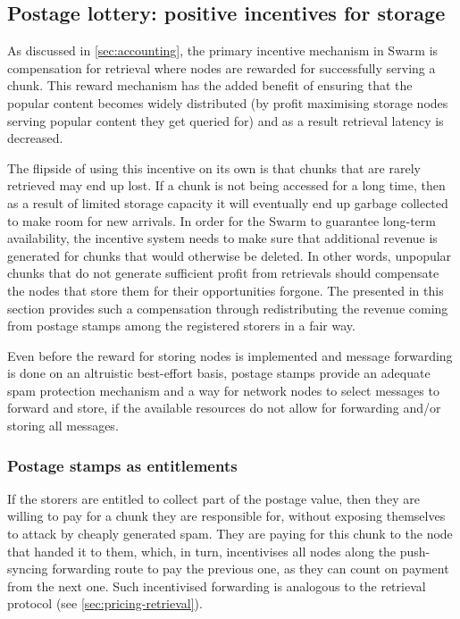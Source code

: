 \subsection{Postage lottery: positive incentives for storage}\label{sec:postage-lottery}



As discussed in \ref{sec:accounting}, the primary incentive mechanism in Swarm is compensation for retrieval where nodes are rewarded for successfully serving a chunk. This reward mechanism has the added benefit of ensuring that the popular content becomes widely distributed (by profit maximising storage nodes serving popular content they get queried for) and as a result retrieval latency is decreased.

The flipside of using this incentive on its own is that chunks that are rarely retrieved may end up lost. If a chunk is not being accessed for a long time, then as a result of limited storage capacity it will eventually end up garbage collected to make room for new arrivals. In order for the Swarm to guarantee long-term availability, the incentive system needs to make sure that additional revenue is generated for chunks that would otherwise be deleted. In other words, unpopular chunks that do not generate sufficient profit from retrievals should compensate the nodes that store them for their opportunities forgone. The  presented  in this section provides such a compensation through redistributing the revenue coming from  postage stamps among the registered storers in a fair  way.

Even before the reward for storing nodes is implemented and message forwarding is done on an altruistic best-effort basis, postage stamps provide an adequate spam protection mechanism and a way for network nodes to select messages to forward and store, if the available resources do not allow for forwarding and/or storing all messages.

\subsubsection{Postage stamps as entitlements}

If the storers are entitled to collect part of the postage value, then they are willing to pay for a chunk they are responsible for, without exposing themselves to attack by cheaply generated spam. They are paying for this chunk to the node that handed it to them, which, in turn, incentivises all nodes along the push-syncing forwarding route to pay the previous one, as they can count on payment from the next one. Such incentivised forwarding is analogous to the retrieval protocol (see \ref{sec:pricing-retrieval}).

